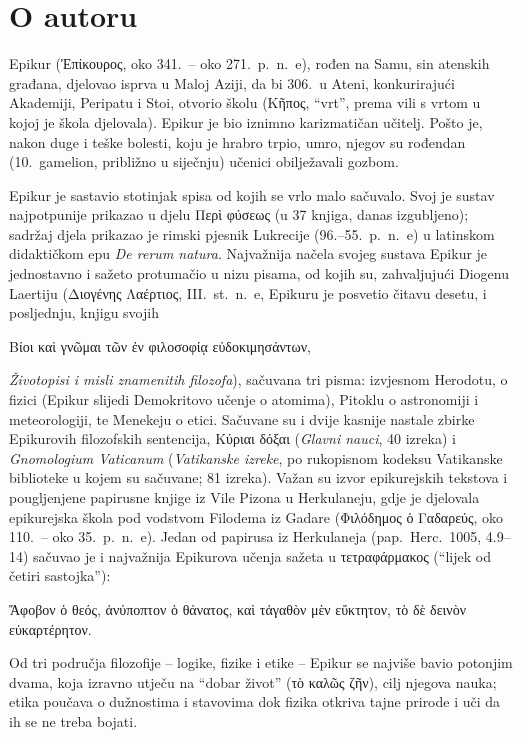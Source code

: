 \section*{O autoru}

Epikur (Ἐπίκουρος, oko 341.\ – oko 271.\ p.~n.~e), rođen na Samu, sin atenskih građana, djelovao isprva u Maloj Aziji, da bi 306.\ u Ateni, konkurirajući Akademiji, Peripatu i Stoi, otvorio školu (Κῆπος, ``vrt'', prema vili s vrtom u kojoj je škola djelovala). Epikur je bio iznimno karizmatičan učitelj. Pošto je, nakon duge i teške bolesti, koju je hrabro trpio, umro, njegov su rođendan (10.\ gamelion, približno u siječnju) učenici obilježavali gozbom.

Epikur je sastavio stotinjak spisa od kojih se vrlo malo sačuvalo. Svoj je sustav najpotpunije prikazao u djelu Περὶ φύσεως (u 37 knjiga, danas izgubljeno); sadržaj djela prikazao je rimski pjesnik Lukrecije (96.–55.\ p.~n.~e) u latinskom didaktičkom epu \textit{De rerum natura}. Najvažnija načela svojeg sustava Epikur je jednostavno i sažeto protumačio u nizu pisama, od kojih su, zahvaljujući Diogenu Laertiju (Διογένης Λαέρτιος, III.\ st.\ n.~e, Epikuru je posvetio čitavu desetu, i posljednju, knjigu svojih \begin{greek}Βίοι καὶ γνῶμαι τῶν ἐν φιλοσοφίᾳ εὐδοκιμησάντων,\end{greek} \textit{Životopisi i misli znamenitih filozofa}), sačuvana tri pisma: izvjesnom Herodotu, o fizici (Epikur slijedi Demokritovo učenje o atomima), Pitoklu o astronomiji i meteorologiji, te Menekeju o etici. Sačuvane su i dvije kasnije nastale zbirke Epikurovih filozofskih sentencija, Κύριαι δόξαι (\textit{Glavni nauci}, 40 izreka) i \textit{Gnomologium Vaticanum} (\textit{Vatikanske izreke}, po rukopisnom kodeksu Vatikanske biblioteke u kojem su sačuvane; 81 izreka). Važan su izvor epikurejskih tekstova i pougljenjene papirusne knjige iz Vile Pizona u Herkulaneju, gdje je djelovala epikurejska škola pod vodstvom Filodema iz Gadare (Φιλόδημος ὁ Γαδαρεύς, oko 110.\ – oko 35.\ p.~n.~e). Jedan od papirusa iz Herkulaneja (pap.\ Herc.\ 1005, 4.9–14) sačuvao je i najvažnija Epikurova učenja sažeta u τετραφάρμακος (``lijek od četiri sastojka''): \begin{greek}Ἄφοβον ὁ θεός, ἀνύποπτον ὁ θάνατος, καὶ τἀγαθὸν μὲν εὔκτητον, τὸ δὲ δεινὸν εὐκαρτέρητον.\end{greek}

Od tri područja filozofije – logike, fizike i etike – Epikur se najviše bavio potonjim dvama, koja izravno utječu na ``dobar život'' \textgreek{(τὸ καλῶς ζῆν),} cilj njegova nauka; etika poučava o dužnostima i stavovima dok fizika otkriva tajne prirode i uči da ih se ne treba bojati. 

